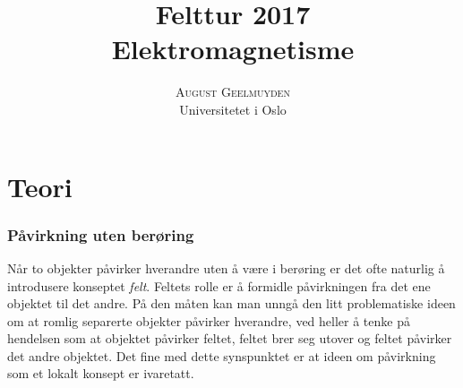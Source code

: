 \documentclass[twoside,utf8]{article}
\title{\vspace{-15mm}\fontsize{24pt}{10pt}\selectfont Felttur 2017 \\ \textbf{Elektromagnetisme} } %
\author{
\large
\textsc{August Geelmuyden}\\[2mm] %
\normalsize Universitetet i Oslo \\ %
\vspace{-15mm}
}
\date{}
\begin{document}
\maketitle %




\part*{Teori}

\section{Påvirkning uten berøring}
Når to objekter påvirker hverandre uten å være i berøring er det ofte naturlig å introdusere konseptet {\it felt}. Feltets rolle er å formidle påvirkningen fra det ene objektet til det andre. På den måten kan man unngå den litt problematiske ideen om at romlig separerte objekter påvirker hverandre, ved heller å tenke på hendelsen som at objektet påvirker feltet, feltet brer seg utover og feltet påvirker det andre objektet. Det fine med dette synspunktet er at ideen om påvirkning som et lokalt konsept er ivaretatt.
\end{document}
